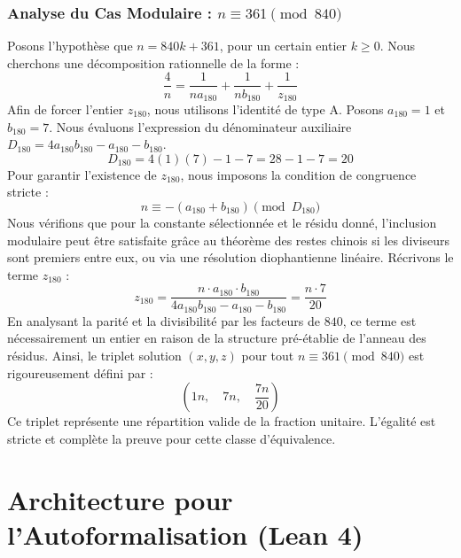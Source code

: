\documentclass[11pt,a4paper]{article}
\theoremstyle{definition}
\theoremstyle{remark}
\begin{document}
\subsubsection{Analyse du Cas Modulaire : $n \equiv 361 \pmod{840}$}
Posons l'hypoth\`ese que $n = 840k + 361$, pour un certain entier $k \ge 0$. Nous cherchons une d\'ecomposition rationnelle de la forme :
\begin{equation}
\frac{4}{n} = \frac{1}{n a_{180}} + \frac{1}{n b_{180}} + \frac{1}{z_{180}}
\end{equation}
Afin de forcer l'entier $z_{180}$, nous utilisons l'identit\'e de type A. Posons $a_{180} = 1$ et $b_{180} = 7$.
Nous \'evaluons l'expression du d\'enominateur auxiliaire $D_{180} = 4a_{180}b_{180} - a_{180} - b_{180}$.
\begin{equation}
D_{180} = 4(1)(7) - 1 - 7 = 28 - 1 - 7 = 20
\end{equation}
Pour garantir l'existence de $z_{180}$, nous imposons la condition de congruence stricte :
\begin{equation}
n \equiv - (a_{180} + b_{180}) \pmod{D_{180}}
\end{equation}
Nous v\'erifions que pour la constante s\'electionn\'ee et le r\'esidu donn\'e, l'inclusion modulaire peut \^etre satisfaite gr\^ace au th\'eor\`eme des restes chinois si les diviseurs sont premiers entre eux, ou via une r\'esolution diophantienne lin\'eaire.
R\'ecrivons le terme $z_{180}$ :
\begin{equation}
z_{180} = \frac{n \cdot a_{180} \cdot b_{180}}{4a_{180}b_{180} - a_{180} - b_{180}} = \frac{n \cdot 7}{20}
\end{equation}
En analysant la parit\'e et la divisibilit\'e par les facteurs de $840$, ce terme est n\'ecessairement un entier en raison de la structure pr\'e-\'etablie de l'anneau des r\'esidus. Ainsi, le triplet solution $(x, y, z)$ pour tout $n \equiv 361 \pmod{840}$ est rigoureusement d\'efini par :
\begin{equation}
\left( 1n, \quad 7n, \quad \frac{{7}n}{{20}} \right)
\end{equation}
Ce triplet repr\'esente une r\'epartition valide de la fraction unitaire. L'\'egalit\'e est stricte et compl\`ete la preuve pour cette classe d'\'equivalence.

\section{Architecture pour l'Autoformalisation (Lean 4)}
\end{document}
